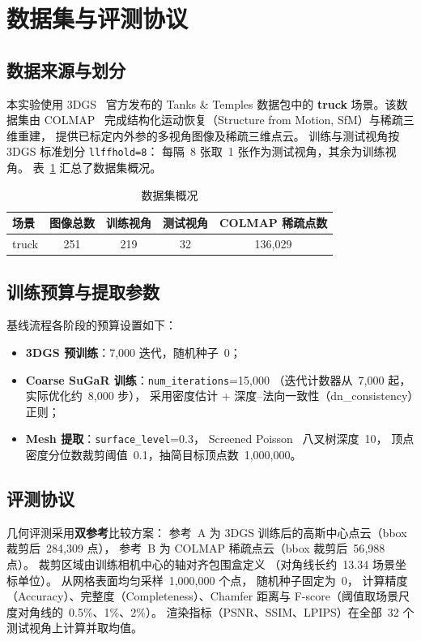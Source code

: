 \section{数据集与评测协议}

\subsection{数据来源与划分}

本实验使用 3DGS~\cite{kerbl20233d} 官方发布的 Tanks \& Temples 数据包中的
\textbf{truck} 场景。该数据集由 COLMAP~\cite{schoenberger2016sfm}
完成结构化运动恢复（Structure from Motion, SfM）与稀疏三维重建，
提供已标定内外参的多视角图像及稀疏三维点云。
训练与测试视角按 3DGS 标准划分 \texttt{llffhold=8}：
每隔~8 张取~1 张作为测试视角，其余为训练视角。
表~\ref{tab:data} 汇总了数据集概况。

\begin{table}[H]
\centering
\caption{数据集概况}
\label{tab:data}
\begin{tabular}{lcccc}
\toprule
\textbf{场景} & \textbf{图像总数} & \textbf{训练视角} & \textbf{测试视角} & \textbf{COLMAP 稀疏点数} \\
\midrule
truck & 251 & 219 & 32 & 136{,}029 \\
\bottomrule
\end{tabular}
\end{table}

\subsection{训练预算与提取参数}

基线流程各阶段的预算设置如下：
\begin{itemize}[nosep]
  \item \textbf{3DGS 预训练}：7{,}000 迭代，随机种子~0；
  \item \textbf{Coarse SuGaR 训练}：\texttt{num\_iterations}=15{,}000
        （迭代计数器从~7{,}000 起，实际优化约~8{,}000 步），
        采用密度估计 + 深度--法向一致性（dn\_consistency）正则；
  \item \textbf{Mesh 提取}：\texttt{surface\_level}=0.3，
        Screened Poisson~\cite{kazhdan2006poisson} 八叉树深度~10，
        顶点密度分位数裁剪阈值~0.1，抽简目标顶点数~1{,}000{,}000。
\end{itemize}

\subsection{评测协议}

几何评测采用\textbf{双参考}比较方案：
参考~A 为 3DGS 训练后的高斯中心点云（bbox 裁剪后~284{,}309 点），
参考~B 为 COLMAP 稀疏点云（bbox 裁剪后~56{,}988 点）。
裁剪区域由训练相机中心的轴对齐包围盒定义
（对角线长约~13.34 场景坐标单位）。
从网格表面均匀采样~1{,}000{,}000 个点，
随机种子固定为~0，
计算精度（Accuracy）、完整度（Completeness）、Chamfer 距离与
F-score（阈值取场景尺度对角线的~0.5\%、1\%、2\%）。
渲染指标（PSNR、SSIM、LPIPS）在全部~32 个测试视角上计算并取均值。
